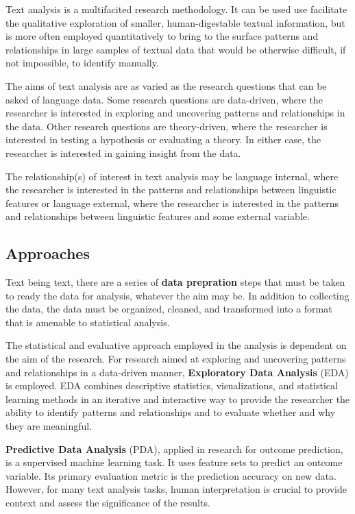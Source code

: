 \documentclass[
  letterpaper,
  DIV=11,
  numbers=noendperiod]{scrreprt}
\theoremstyle{definition}
\theoremstyle{remark}
\begin{document}
Text analysis is a multifacited research methodology. It can be used use
facilitate the qualitative exploration of smaller, human-digestable
textual information, but is more often employed quantitatively to bring
to the surface patterns and relationships in large samples of textual
data that would be otherwise difficult, if not impossible, to identify
manually.

The aims of text analysis are as varied as the research questions that
can be asked of language data. Some research questions are data-driven,
where the researcher is interested in exploring and uncovering patterns
and relationships in the data. Other research questions are
theory-driven, where the researcher is interested in testing a
hypothesis or evaluating a theory. In either case, the researcher is
interested in gaining insight from the data.

The relationship(s) of interest in text analysis may be language
internal, where the researcher is interested in the patterns and
relationships between linguistic features or language external, where
the researcher is interested in the patterns and relationships between
linguistic features and some external variable.

\subsection{Approaches}\label{approaches}

Text being text, there are a series of \textbf{data prepration} steps
that must be taken to ready the data for analysis, whatever the aim may
be. In addition to collecting the data, the data must be organized,
cleaned, and transformed into a format that is amenable to statistical
analysis.

The statistical and evaluative approach employed in the analysis is
dependent on the aim of the research. For research aimed at exploring
and uncovering patterns and relationships in a data-driven manner,
\textbf{Exploratory Data Analysis} (EDA) is employed. EDA combines
descriptive statistics, visualizations, and statistical learning methods
in an iterative and interactive way to provide the researcher the
ability to identify patterns and relationships and to evaluate whether
and why they are meaningful.

\textbf{Predictive Data Analysis} (PDA), applied in research for outcome
prediction, is a supervised machine learning task. It uses feature sets
to predict an outcome variable. Its primary evaluation metric is the
prediction accuracy on new data. However, for many text analysis tasks,
human interpretation is crucial to provide context and assess the
significance of the results.
\end{document}
